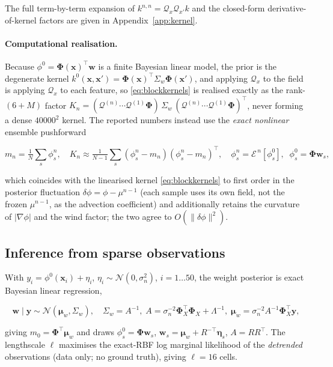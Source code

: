 \documentclass[11pt]{article}
\newcommand{\bx}{\mathbf{x}}
\newcommand{\bw}{\mathbf{w}}
\newcommand{\N}{\mathcal{N}}
\newcommand{\Qop}{\mathcal{Q}}
\begin{document}
The full term-by-term expansion of $k^{n,n}=\Qop_x\Qop_{x'}k$ and the closed-form
derivative-of-kernel factors are given in Appendix~\ref{app:kernel}.

\paragraph{Computational realisation.}
Because $\phi^{0}=\bm\Phi(\bx)^{\!\top}\bw$ is a finite Bayesian linear model, the
prior is the degenerate kernel $k^{0}(\bx,\bx')=\bm\Phi(\bx)^{\!\top}\Sigma_w\bm\Phi(\bx')$,
and applying $\Qop_x$ to the field is applying $\Qop_x$ to each feature, so
\eqref{eq:blockkernels} is realised exactly as the rank-$(6{+}M)$ factor
$K_n=(\Qop^{(n)}\!\cdots\Qop^{(1)}\bm\Phi)\,\Sigma_w\,(\Qop^{(n)}\!\cdots\Qop^{(1)}\bm\Phi)^{\!\top}$,
never forming a dense $40000^2$ kernel. The reported numbers instead use the
\emph{exact nonlinear} ensemble pushforward

\begin{equation}
  \label{eq:ensemble}
  m_n=\tfrac1N\!\sum_{s}\phi^{n}_s,\quad
  K_n\approx\tfrac1{N-1}\!\sum_{s}(\phi^{n}_s-m_n)(\phi^{n}_s-m_n)^{\!\top},
  \quad \phi^{n}_s=\mathcal{E}^{\,n}[\phi^{0}_s],\;\;\phi^{0}_s=\bm\Phi\bw_s,
\end{equation}

which coincides with the linearised kernel \eqref{eq:blockkernels} to first order in
the posterior fluctuation $\delta\phi=\phi-\mu^{n-1}$ (each sample uses its own
field, not the frozen $\mu^{n-1}$, as the advection coefficient) and additionally
retains the curvature of $\lvert\nabla\phi\rvert$ and the wind factor; the two
agree to $O(\lVert\delta\phi\rVert^{2})$.

\subsection{Inference from sparse observations}

With $y_i=\phi^{0}(\bx_i)+\eta_i$, $\eta_i\sim\N(0,\sigma_n^2)$, $i=1\dots50$, the
weight posterior is exact Bayesian linear regression,

\begin{equation}
  \label{eq:posterior}
  \bw\mid\mathbf y\sim\N(\bm\mu_w,\Sigma_w),\quad
  \Sigma_w=A^{-1},\;
  A=\sigma_n^{-2}\bm\Phi_X^{\!\top}\bm\Phi_X+\Lambda^{-1},\;
  \bm\mu_w=\sigma_n^{-2}A^{-1}\bm\Phi_X^{\!\top}\mathbf y,
\end{equation}

giving $m_0=\bm\Phi^{\!\top}\bm\mu_w$ and draws
$\phi^{0}_s=\bm\Phi\bw_s$, $\bw_s=\bm\mu_w+R^{-\top}\bm\eta_s$, $A=RR^{\!\top}$. The
lengthscale $\ell$ maximises the exact-RBF log marginal likelihood of the
\emph{detrended} observations (data only; no ground truth), giving $\ell=16$ cells.
\end{document}
